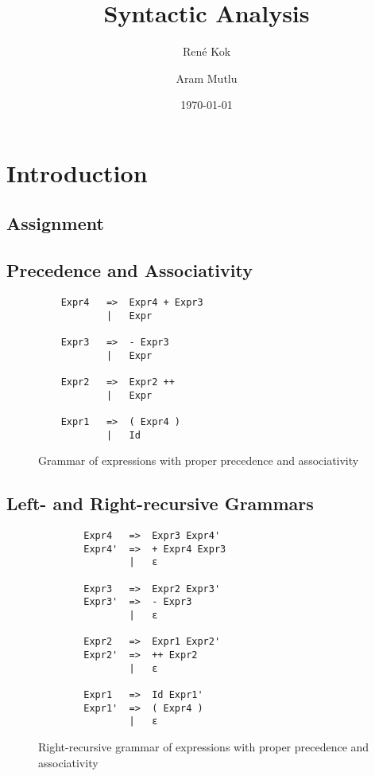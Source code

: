 \documentclass[hidelinks]{uva-inf-article}
\title{Syntactic Analysis}
\author{René Kok}
\author{Aram Mutlu}
\date{\today}
\begin{document}
\maketitle

\section{Introduction}
\begin{flushleft}


\newpage
\section{Assignment}
\subsection{Precedence and Associativity}
\begin{figure}[h]
    \begin{lstlisting}
    Expr4   =>  Expr4 + Expr3 
            |   Expr

    Expr3   =>  - Expr3 
            |   Expr

    Expr2   =>  Expr2 ++ 
            |   Expr
            
    Expr1   =>  ( Expr4 ) 
            |   Id
    \end{lstlisting}
    \caption{Grammar of expressions with proper precedence and associativity}
    \label{fig:1}
\end{figure}
\subsection{Left- and Right-recursive Grammars}
\begin{figure}[h]
    \begin{lstlisting}
        Expr4   =>  Expr3 Expr4'
        Expr4'  =>  + Expr4 Expr3
                |   ε
        
        Expr3   =>  Expr2 Expr3'
        Expr3'  =>  - Expr3
                |   ε
        
        Expr2   =>  Expr1 Expr2'
        Expr2'  =>  ++ Expr2
                |   ε
        
        Expr1   =>  Id Expr1'
        Expr1'  =>  ( Expr4 )
                |   ε
    \end{lstlisting}
    \caption{Right-recursive grammar of expressions with proper precedence and associativity}
    \label{fig:2}
\end{figure}
\newpage

\end{flushleft}
\end{document}
